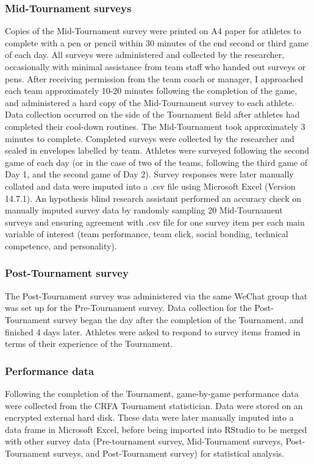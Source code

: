 \begin{CJK}{UTF8}{gbsn}
\subsubsection{Mid-Tournament surveys}
Copies of the Mid-Tournament survey were printed on A4 paper for athletes to complete with a pen or pencil within 30 minutes of the end second or third game of each day.  All surveys were administered and collected by the researcher, occasionally with minimal assistance from team staff who handed out surveys or pens. After receiving permission from the team coach or manager, I approached each team approximately 10-20 minutes following the completion of the game, and administered a hard copy of the Mid-Tournament survey to each athlete.  Data collection occurred on the side of the Tournament field after athletes had completed their cool-down routines.  The Mid-Tournament took approximately 3 minutes to complete. Completed surveys were collected by the researcher and sealed in envelopes labelled by team. Athletes were surveyed following the second game of each day (or in the case of two of the teams, following the third game of Day 1, and the second game of Day 2).  Survey responses were later manually collated and data were imputed into a .csv file using Microsoft Excel (Version 14.7.1).  An hypothesis blind research assistant performed an accuracy check on manually imputed survey data by randomly sampling 20 Mid-Tournament surveys and ensuring agreement with .csv file for one survey item per each main variable of interest (team performance, team click, social bonding, technical competence, and personality).

\subsubsection{Post-Tournament survey}
The Post-Tournament survey was administered via the same WeChat group that was set up for the Pre-Tournament survey. Data collection for the Post-Tournament survey began the day after the completion of the Tournament, and finished 4 days later. Athletes were asked to respond to survey items framed in terms of their experience of the Tournament.

\subsubsection{Performance data}
Following the completion of the Tournament, game-by-game performance data were collected from the CRFA Tournament statistician.  Data were stored on an encrypted external hard disk. These data were later manually imputed into a data frame in Microsoft Excel, before being imported into RStudio to be merged with other survey data (Pre-tournament survey, Mid-Tournament surveys, Post-Tournament surveys, and Post-Tournament survey) for statistical analysis.


\end{CJK}
